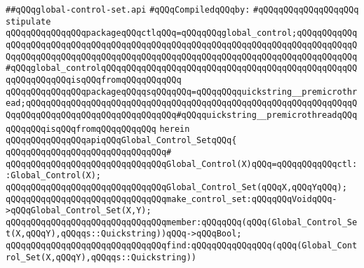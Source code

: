 \label{src/lib/global-controls/global-control-set.api}
\verb|##qQQqglobal-control-set.api|\newline
\newline
\verb|#qQQqCompiledqQQqby:|\newline
\verb|#qQQqqQQqqQQqqQQqqQQq|\newline
\newline
\newline
\verb|stipulate|\newline
\verb|qQQqqQQqqQQqqQQqpackageqQQqctlqQQq=qQQqqQQqglobal_control;qQQqqQQqqQQqqQQqqQQqqQQqqQQqqQQqqQQqqQQqqQQqqQQqqQQqqQQqqQQqqQQqqQQqqQQqqQQqqQQqqQQqqQQqqQQqqQQqqQQqqQQqqQQqqQQqqQQqqQQqqQQqqQQqqQQqqQQqqQQqqQQqqQQqqQQq#qQQqglobal_controlqQQqqQQqqQQqqQQqqQQqqQQqqQQqqQQqqQQqqQQqqQQqqQQqqQQqqQQqqQQqqQQqisqQQqfromqQQqqQQqqQQq|\newline
\verb|qQQqqQQqqQQqqQQqpackageqQQqqsqQQqqQQq=qQQqqQQqquickstring__premicrothread;qQQqqQQqqQQqqQQqqQQqqQQqqQQqqQQqqQQqqQQqqQQqqQQqqQQqqQQqqQQqqQQqqQQqqQQqqQQqqQQqqQQqqQQqqQQqqQQqqQQq#qQQqquickstring__premicrothreadqQQqqQQqqQQqisqQQqfromqQQqqQQqqQQq|\newline
\verb|herein|\newline
\newline
\verb|qQQqqQQqqQQqqQQqapiqQQqGlobal_Control_SetqQQq{|\newline
\verb|qQQqqQQqqQQqqQQqqQQqqQQqqQQqqQQq#|\newline
\verb|qQQqqQQqqQQqqQQqqQQqqQQqqQQqqQQqGlobal_Control(X)qQQq=qQQqqQQqqQQqctl::Global_Control(X);|\newline
\newline
\verb|qQQqqQQqqQQqqQQqqQQqqQQqqQQqqQQqGlobal_Control_Set(qQQqX,qQQqYqQQq);|\newline
\newline
\verb|qQQqqQQqqQQqqQQqqQQqqQQqqQQqqQQqmake_control_set:qQQqqQQqVoidqQQq->qQQqGlobal_Control_Set(X,Y);|\newline
\newline
\verb|qQQqqQQqqQQqqQQqqQQqqQQqqQQqqQQqmember:qQQqqQQq(qQQq(Global_Control_Set(X,qQQqY),qQQqqs::Quickstring))qQQq->qQQqBool;|\newline
\newline
\verb|qQQqqQQqqQQqqQQqqQQqqQQqqQQqqQQqfind:qQQqqQQqqQQqqQQq(qQQq(Global_Control_Set(X,qQQqY),qQQqqs::Quickstring))|\newline
